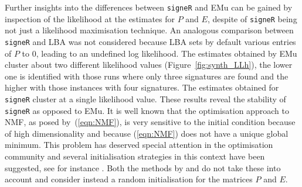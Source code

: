 \documentclass{bioinfo}
\begin{document}
Further insights into the differences between \texttt{signeR} and EMu
can be gained by inspection of the likelihood at the estimates for $P$
and $E$, despite of \texttt{signeR} being not just a likelihood
maximisation technique. An analogous comparison between
\texttt{signeR} and LBA was not considered because LBA sets by default
various entries of $P$ to 0, leading to an undefined log
likelihood. The estimates obtained by EMu cluster about two different
likelihood values (Figure~\ref{fig:synth_LLh}), the lower one is
identified with those runs where only three signatures are found and
the higher with those instances with four signatures. The estimates
obtained for \texttt{signeR} cluster at a single likelihood
value. These results reveal the stability of \texttt{signeR} as
opposed to EMu. It is well known that the optimisation approach to
NMF, as posed by~(\ref{eqn:NMF}), is very sensitive to the initial
condition because of high dimensionality and because (\ref{eqn:NMF})
does not have a unique global minimum. This problem has deserved
special attention in the optimisation community and several
initialisation strategies in this context have been suggested, see for
instance \cite{BBLPP, BG, LNACDarXiv}. Both the methods by
\cite{FICMV} and \cite{A} do not take these into account and consider
instead a random initialisation for the matrices $P$ and $E$. 
\end{document}
